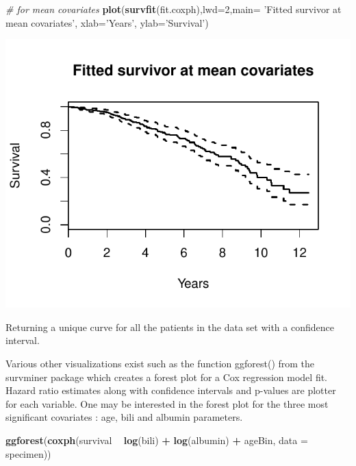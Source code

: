 \documentclass[]{article}
\newenvironment{Shaded}{\begin{snugshade}}{\end{snugshade}}
\newcommand{\KeywordTok}[1]{\textcolor[rgb]{0.13,0.29,0.53}{\textbf{#1}}}
\newcommand{\DataTypeTok}[1]{\textcolor[rgb]{0.13,0.29,0.53}{#1}}
\newcommand{\DecValTok}[1]{\textcolor[rgb]{0.00,0.00,0.81}{#1}}
\newcommand{\StringTok}[1]{\textcolor[rgb]{0.31,0.60,0.02}{#1}}
\newcommand{\CommentTok}[1]{\textcolor[rgb]{0.56,0.35,0.01}{\textit{#1}}}
\newcommand{\OperatorTok}[1]{\textcolor[rgb]{0.81,0.36,0.00}{\textbf{#1}}}
\newcommand{\NormalTok}[1]{#1}
\begin{document}
\begin{Shaded}
\begin{Highlighting}[]
\CommentTok{# for mean covariates}
\KeywordTok{plot}\NormalTok{(}\KeywordTok{survfit}\NormalTok{(fit.coxph),}\DataTypeTok{lwd=}\DecValTok{2}\NormalTok{,}\DataTypeTok{main=} \StringTok{'Fitted survivor at mean covariates'}\NormalTok{, }
     \DataTypeTok{xlab=}\StringTok{'Years'}\NormalTok{, }\DataTypeTok{ylab=}\StringTok{'Survival'}\NormalTok{)}
\end{Highlighting}
\end{Shaded}

\includegraphics{survival_v5_files/figure-latex/unnamed-chunk-35-2.pdf}

Returning a unique curve for all the patients in the data set with a
confidence interval.

Various other visualizations exist such as the function ggforest() from
the survminer package which creates a forest plot for a Cox regression
model fit. Hazard ratio estimates along with confidence intervals and
p-values are plotter for each variable. One may be interested in the
forest plot for the three most significant covariates : age, bili and
albumin parameters.

\begin{Shaded}
\begin{Highlighting}[]
\KeywordTok{ggforest}\NormalTok{(}\KeywordTok{coxph}\NormalTok{(survival }\OperatorTok{~}\StringTok{ }\KeywordTok{log}\NormalTok{(bili) }\OperatorTok{+}\StringTok{ }\KeywordTok{log}\NormalTok{(albumin) }\OperatorTok{+}\StringTok{ }\NormalTok{ageBin, }\DataTypeTok{data =}\NormalTok{ specimen))}
\end{Highlighting}
\end{Shaded}
\end{document}
